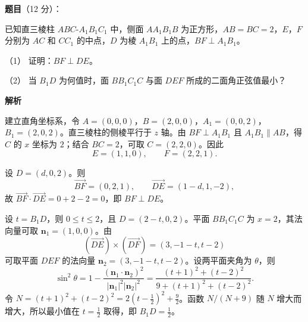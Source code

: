 \begin{answer}

\textbf{题目}（12 分）：

已知直三棱柱 $ABC\text{-}A_1B_1C_1$ 中，侧面 $AA_1B_1B$ 为正方形，$AB=BC=2$，$E$，$F$ 分别为 $AC$ 和 $CC_1$ 的中点，$D$ 为棱 $A_1B_1$ 上的点，$BF\perp A_1B_1$。
\nopagebreak[4]
\begin{center}\end{center}
\nopagebreak[4]
（1） 证明：$BF\perp DE$。

（2） 当 $B_1D$ 为何值时，面 $BB_1C_1C$ 与面 $DEF$ 所成的二面角正弦值最小？

\textbf{解析}

建立直角坐标系，令 $A=(0,0,0)$，$B=(2,0,0)$，$A_1=(0,0,2)$，$B_1=(2,0,2)$。直三棱柱的侧棱平行于 $z$ 轴。由 $BF\perp A_1B_1$ 且 $A_1B_1\parallel AB$，得 $C$ 的 $x$ 坐标为 $2$；结合 $BC=2$，可取 $C=(2,2,0)$。因此
\nopagebreak[4]
\[
E=(1,1,0),\qquad F=(2,2,1).
\]


设 $D=(d,0,2)$。则
\nopagebreak[4]
\[
\overrightarrow{BF}=(0,2,1),\qquad
\overrightarrow{DE}=(1-d,1,-2),
\]
故 $\overrightarrow{BF}\cdot\overrightarrow{DE}=0+2-2=0$，即 $BF\perp DE$。


设 $t=B_1D$，则 $0\leqslant t\leqslant2$，且 $D=(2-t,0,2)$。平面 $BB_1C_1C$ 为 $x=2$，其法向量可取 $\boldsymbol n_1=(1,0,0)$。由
\nopagebreak[4]
\[
(\overrightarrow{DE})\times(\overrightarrow{DF})
=(3,-1-t,t-2)
\]
可取平面 $DEF$ 的法向量 $\boldsymbol n_2=(3,-1-t,t-2)$。设两平面夹角为 $\theta$，则
\nopagebreak[4]
\[
\sin^2\theta
=1-\frac{(\boldsymbol n_1\cdot\boldsymbol n_2)^2}{|\boldsymbol n_1|^2|\boldsymbol n_2|^2}
=\frac{(t+1)^2+(t-2)^2}{9+(t+1)^2+(t-2)^2}.
\]
令 $N=(t+1)^2+(t-2)^2=2(t-\tfrac12)^2+\tfrac92$。函数 $N/(N+9)$ 随 $N$ 增大而增大，所以最小值在 $t=\tfrac12$ 取得，即 $B_1D=\tfrac12$。



\end{answer}
